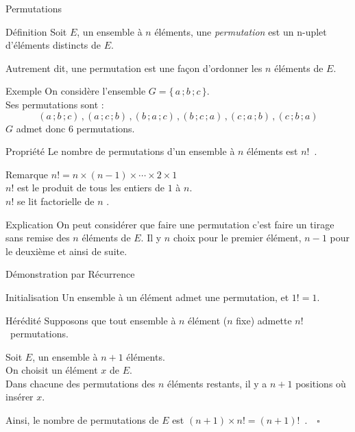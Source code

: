 \documentclass{cours}
\begin{document}
    \begin{Gpartie}{Permutations}
        \begin{Spartie}{Définition}
            Soit $E$, un ensemble à $n$ éléments, une \emph{permutation} est un n-uplet d'éléments distincts de $E$.

            Autrement dit, une permutation est une façon d'ordonner les $n$ éléments de $E$.
            \begin{SSpartie}{Exemple}
                On considère l'ensemble $G=\big\{\, a\,; b\,; c\, \big\}$. \\ Ses permutations sont :
                \[(a\,; b\,; c)\,, (a\,; c\,; b)\,, (b\,; a\,; c)\,, (b\,; c\,; a)\,, ( c\,; a\,; b)\,,(c\,; b\,; a)\]
                $G$ admet donc 6 permutations.
            \end{SSpartie}
        \end{Spartie}
        \begin{Spartie}{Propriété}
            Le nombre de permutations d'un ensemble à $n$ éléments est $n!$~.
            \begin{SSpartie}{Remarque}
                $n! =n\times(n-1)\times\dotsb\times 2\times 1$ \\
                $n!$ est le produit de tous les entiers de $1$ à $n$. \\
                $n!$ se lit \og factorielle de $n$ \fg{}.
            \end{SSpartie}
            \begin{SSpartie}{Explication}
                On peut considérer que faire une permutation c'est faire un tirage sans remise des $n$ éléments de $E$. Il y $n$ choix pour le premier élément, $n-1$ pour le deuxième et ainsi de suite.
            \end{SSpartie}
            \begin{SSpartie}{Démonstration par Récurrence}
                \begin{SSSpartie}{Initialisation}
                    Un ensemble à un élément admet une permutation, et $1! =1$.
                \end{SSSpartie}
                \begin{SSSpartie}{Hérédité}
                    Supposons que tout ensemble à $n$ élément ($n$ fixe) admette $n!$~permutations.

                    Soit $E$, un ensemble à $n+1$ éléments. \\
                    On choisit un élément $x$ de $E$. \\
                    Dans chacune des permutations des $n$ éléments restants, il y a $n+1$ positions où insérer $x$.

                    Ainsi, le nombre de permutations de $E$ est $(n+1)\times n! =(n+1)!$~.$\quad\square$
                \end{SSSpartie}
            \end{SSpartie}
        \end{Spartie}
    \end{Gpartie}
\end{document}
